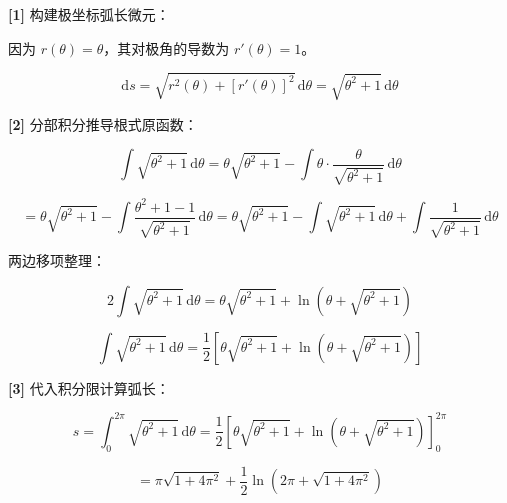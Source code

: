 \documentclass[11pt,a4paper,UTF8]{ctexart}
\begin{document}
\begin{solbox}[分步推导与答题规范]
\textbf{[1]} 构建极坐标弧长微元：

因为 $r(\theta) = \theta$，其对极角的导数为 $r'(\theta) = 1$。


\begin{equation*}
\mathrm{d}s = \sqrt{r^2(\theta) + [r'(\theta)]^2}\,\mathrm{d}\theta = \sqrt{\theta^2 + 1}\,\mathrm{d}\theta
\end{equation*}


\textbf{[2]} 分部积分推导根式原函数：


\begin{equation*}
\int \sqrt{\theta^2+1}\,\mathrm{d}\theta = \theta\sqrt{\theta^2+1} - \int \theta \cdot \frac{\theta}{\sqrt{\theta^2+1}}\,\mathrm{d}\theta
\end{equation*}



\begin{equation*}
= \theta\sqrt{\theta^2+1} - \int \frac{\theta^2+1-1}{\sqrt{\theta^2+1}}\,\mathrm{d}\theta = \theta\sqrt{\theta^2+1} - \int \sqrt{\theta^2+1}\,\mathrm{d}\theta + \int \frac{1}{\sqrt{\theta^2+1}}\,\mathrm{d}\theta
\end{equation*}


两边移项整理：


\begin{equation*}
2\int \sqrt{\theta^2+1}\,\mathrm{d}\theta = \theta\sqrt{\theta^2+1} + \ln(\theta + \sqrt{\theta^2+1})
\end{equation*}



\begin{equation*}
\int \sqrt{\theta^2+1}\,\mathrm{d}\theta = \frac{1}{2}\left[\theta\sqrt{\theta^2+1} + \ln(\theta + \sqrt{\theta^2+1})\right]
\end{equation*}


\textbf{[3]} 代入积分限计算弧长：


\begin{equation*}
s = \int_0^{2\pi} \sqrt{\theta^2+1}\,\mathrm{d}\theta = \frac{1}{2}\left[\theta\sqrt{\theta^2+1} + \ln(\theta + \sqrt{\theta^2+1})\right]_0^{2\pi}
\end{equation*}



\begin{equation*}
= \pi\sqrt{1+4\pi^2} + \frac{1}{2}\ln(2\pi + \sqrt{1+4\pi^2})
\end{equation*}

\end{solbox}
\end{document}
